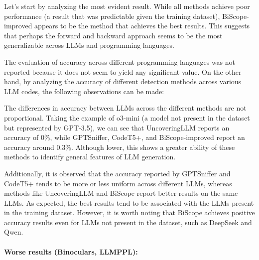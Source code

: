 Let’s start by analyzing the most evident result. While all methods achieve 
poor performance (a result that was predictable given the training dataset), 
BiScope-improved appears to be the method that achieves the best results. 
This suggests that perhaps the forward and backward approach seems to be the 
most generalizable across LLMs and programming languages.

The evaluation of accuracy across different programming languages was not reported 
because it does not seem to yield any significant value. On the other hand, by analyzing 
the accuracy of different detection methods across various LLM codes, the following 
observations can be made:

The differences in accuracy between LLMs across the different methods are not 
proportional. Taking the example of o3-mini (a model not present in the dataset 
but represented by GPT-3.5), we can see that UncoveringLLM reports an accuracy of 
0\%, while GPTSniffer, CodeT5+, and BiScope-improved report an accuracy 
around 0.3\%. Although lower, this shows a greater ability of these methods to 
identify general features of LLM generation.

Additionally, it is observed that the accuracy reported by GPTSniffer and 
CodeT5+ tends to be more or less uniform across different LLMs, whereas 
methods like UncoveringLLM and BiScope report better results on the same 
LLMs. As expected, the best results tend to be associated with the LLMs 
present in the training dataset. However, it is worth noting that BiScope 
achieves positive accuracy results even for LLMs not present in the dataset, 
such as DeepSeek and Qwen.

\paragraph{Worse results (Binoculars, LLMPPL):}


